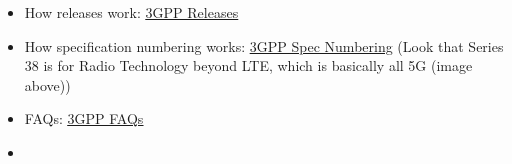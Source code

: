 \begin{itemize}
    \item How releases work: \href{https://www.3gpp.org/specifications/67-releases}{\ul{3GPP Releases}}
    \item How specification numbering works: \href{https://www.3gpp.org/specifications/79-specification-numbering}{\ul{3GPP Spec Numbering}} (Look that Series 38 is for Radio Technology beyond LTE, which is basically all 5G (image above))
    \item FAQs: \href{https://www.3gpp.org/about-3gpp/3gpp-faqs}{\ul{3GPP FAQs}}
    \item 
\end{itemize}























